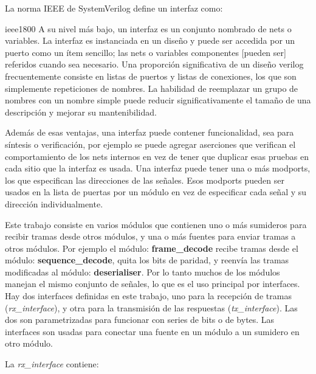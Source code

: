 \documentclass[a4paper, twoside, 11pt]{report}
\begin{document}
La norma IEEE de SystemVerilog define un interfaz como:

\begin{displaycquote}{ieee1800}
A su nivel más bajo, un interfaz es un conjunto nombrado de nets o variables. La interfaz es instanciada en un diseño y puede ser accedida por un puerto como un ítem sencillo; las nets o variables componentes [pueden ser] referidos cuando sea necesario. Una proporción significativa de un diseño verilog frecuentemente consiste en listas de puertos y listas de conexiones, los que son simplemente repeticiones de nombres. La habilidad de reemplazar un grupo de nombres con un nombre simple puede reducir significativamente el tamaño de una descripción y mejorar su mantenibilidad. 
\end{displaycquote}

Además de esas ventajas, una interfaz puede contener funcionalidad, sea para síntesis o verificación, por ejemplo se puede agregar aserciones que verifican el comportamiento de los nets internos en vez de tener que duplicar esas pruebas en cada sitio que la interfaz es usada. Una interfaz puede tener una o más modports, los que especifican las direcciones de las señales. Esos modports pueden ser usados en la lista de puertas por un módulo en vez de especificar cada señal y su dirección individualmente.

Este trabajo consiste en varios módulos que contienen uno o más sumideros para recibir tramas desde otros módulos, y una o más fuentes para enviar tramas a otros módulos. Por ejemplo el módulo: \textbf{frame\_decode} recibe tramas desde el módulo: \textbf{sequence\_decode}, quita los bits de paridad, y reenvía las tramas modificadas al módulo: \textbf{deserialiser}. Por lo tanto muchos de los módulos manejan el mismo conjunto de señales, lo que es el uso principal por interfaces. Hay dos interfaces definidas en este trabajo, uno para la recepción de tramas (\textit{rx\_interface}), y otra para la transmisión de las respuestas (\textit{tx\_interface}). Las dos son parametrizadas para funcionar con series de bits o de bytes. Las interfaces son usadas para conectar una fuente en un módulo a un sumidero en otro módulo.

La \textit{rx\_interface} contiene:
\end{document}
